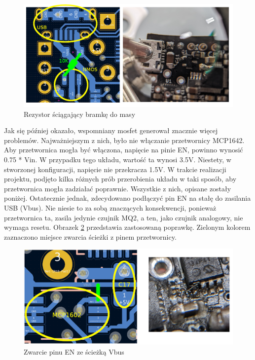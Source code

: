 \begin{figure}[H]
    \centering
    \includegraphics[width=\textwidth, height=\textheight, keepaspectratio]{Graphics/fix_gate.png}
    \caption{Rezystor ściągający bramkę do masy}
    \label{img:fix_gate}
\end{figure}
Jak się później okazało, wspomniany mosfet generował znacznie więcej problemów. Najważniejszym z nich, było nie włączanie przetwornicy MCP1642. Aby przetwornica mogła być włączona, napięcie na pinie EN, powinno wynosić 0.75 * Vin. W przypadku tego układu, wartość ta wynosi 3.5V. Niestety, w stworzonej konfiguracji, napięcie nie przekracza 1.5V. W trakcie realizacji projektu, podjęto kilka różnych prób przerobienia układu w taki sposób, aby przetwornica mogła zadziałać poprawnie. Wszystkie z nich, opisane zostały poniżej. Ostatecznie jednak, zdecydowano podłączyć pin EN na stałę do zasilania USB (Vbus). Nie niesie to za sobą znaczących konsekwencji, ponieważ przetwornica ta, zasila jedynie czujnik MQ2, a ten, jako czujnik analogowy, nie wymaga resetu. Obrazek \ref{img:fix_mcp1642} przedstawia zastosowaną poprawkę. Zielonym kolorem zaznaczono miejsce zwarcia ścieżki z pinem przetwornicy.
\begin{figure}[H]
    \centering
    \includegraphics[width=\textwidth, height=\textheight, keepaspectratio]{Graphics/fix_mcp1602.png}
    \caption{Zwarcie pinu EN ze ścieżką Vbus}
    \label{img:fix_mcp1642}
\end{figure}
